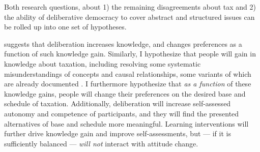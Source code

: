 Both research questions, about 1) the remaining disagreements about tax and 2) the ability of deliberative democracy to cover abstract and structured issues can be rolled up into one set of hypotheses.

\citeauthor{Fishkin2009} suggests that deliberation increases knowledge, and changes preferences as a function of such knowledge gain.
Similarly, I hypothesize that people will gain in knowledge about taxation, including resolving some systematic misunderstandings of concepts and causal relationships, some variants of which are already documented \citep{McCafferyBaron2003,Caplan2007}.
I furthermore hypothesize that \emph{as a function} of these knowledge gains, people will change their preferences on the desired base and schedule of taxation.
Additionally, deliberation will increase self-assessed autonomy and competence of participants, and they will find the presented alternatives of base and schedule more meaningful.
Learning interventions will further drive knowledge gain and improve self-assessments, but --- if it is sufficiently balanced --- \emph{will not} interact with attitude change.

